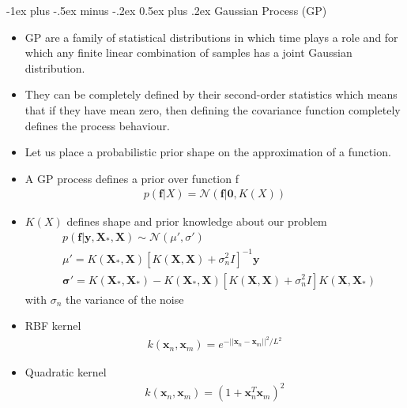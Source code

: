 \documentclass[10pt,a4paper,landscape]{article}
\makeatletter
\renewcommand{\section}{\@startsection{section}{1}{0mm}%
                                {-1ex plus -.5ex minus -.2ex}%
                                {0.5ex plus .2ex}%
                                {\normalfont\tiny\bfseries}}
\def\*#1{\mathbf{#1}}
\def\N{\mathcal{N}}
\makeatother
\begin{document}
\begin{multicols*}{5}
\section{Gaussian Process (GP)}
\begin{itemize}
    \item GP are a family of statistical distributions in which time plays a role and for which any finite linear combination of samples has a joint Gaussian distribution.
    \item They can be completely defined by their second-order statistics which means that if they have mean zero, then defining the covariance function completely defines the process behaviour.
    \item Let us place a probabilistic prior shape on the approximation of a function.
    \item A GP process defines a prior over function f
    \begin{align*}
        p(\*f | X) = \N(\*f | \*0, K(X))
    \end{align*}
    \item $K(X)$ defines shape and prior knowledge about our problem
    \begin{align*}
        &p(\*f | \*y, \*X_*, \*X) \sim \N(\mu', \sigma')\\
        & \mu' = K(\*X_*, \*X)[K(\*X,\*X) + \sigma_n^2 I]^{-1}\*y\\
        & \*\sigma' = K(\*X_*, \*X_*) - K(\*X_*, \*X)[K(\*X, \*X) + \sigma_n^2 I] K(\*X, \*X_*)
    \end{align*}
    with $\sigma_n$ the variance of the noise
    \item RBF kernel
    \begin{align*}
         k(\*x_n, \*x_m) = e^{-|| \*x_n - \*x_m||^2 / L^2}
     \end{align*} 
     \item Quadratic kernel 
     \begin{align*}
         k(\*x_n, \*x_m) = (1 + \*x_n^T \*x_m)^2
     \end{align*}
\end{itemize}


\end{multicols*}
\end{document}
